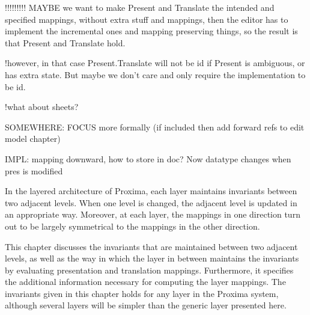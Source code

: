 !!!!!!!!!
MAYBE we want to make Present and Translate the intended and specified mappings, 
without extra stuff and mappings, then the editor has to implement the incremental ones
 and mapping preserving things, so the result is that Present and Translate hold.

!however, in that case Present.Translate will not be id if Present is ambiguous, or 
has extra state. But maybe we don't care and only require the implementation to be id.

!what about sheets? 

SOMEWHERE: FOCUS more formally (if included then add forward refs to edit model chapter)


IMPL: mapping downward, how to store in doc? Now datatype changes when pres is modified

\ec



In the layered architecture of Proxima, each layer maintains invariants between two adjacent levels. When one level is changed, the adjacent level is updated in an appropriate way. Moreover, at each layer, the mappings in one direction turn out to be largely symmetrical to the mappings in the other direction.

This chapter discusses the invariants that are maintained between two adjacent levels, as well as the way in which the layer in between maintains the invariants by evaluating presentation and translation mappings. Furthermore, it specifies the additional information necessary for computing the layer mappings. The invariants given in this chapter holds for any layer in the Proxima system, although several layers will be simpler than the generic layer presented here.







